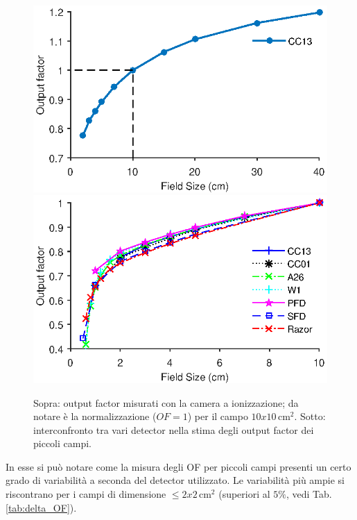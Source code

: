 \begin{figure}[!t]
\centering
\includegraphics[width=.8\textwidth]{./cap2/OF_plots/OFCC13.eps}\\
\includegraphics[width=.8\textwidth]{./cap2/OF_plots/OFSmall.eps}
\caption{Sopra: output factor misurati con la camera a ionizzazione; da notare è la normalizzazione ($OF=1$) per il campo $10x10\,$cm$^2$. Sotto: interconfronto tra vari detector nella stima degli output factor dei piccoli campi.}
\label{fig:OF_res}
\end{figure}
In esse si può notare come la misura degli OF per piccoli campi presenti un certo grado di variabilità a seconda del detector utilizzato. Le variabilità più ampie si riscontrano per i campi di dimensione $\leq 2x2\,$cm$^2$ (superiori al $5\%$, vedi Tab.\ref{tab:delta_OF}). 

